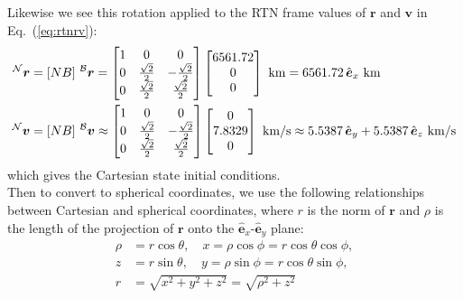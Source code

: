 \documentclass[titlepage]{article}
\begin{document}
Likewise we see this rotation applied to the RTN frame values of $\boldsymbol{r}$ and $\boldsymbol{v}$ in Eq.~(\ref{eq:rtnrv}):
\begin{equation}
	\begin{split}
		\prescript{\mathcal{N}}{}{\boldsymbol{r}}&=[NB]\,\prescript{\mathcal{B}}{}{\boldsymbol{r}}=
		\begin{bmatrix}
			1 & 0 & 0 \\
			0 & \frac{\sqrt{2}}{2} & -\frac{\sqrt{2}}{2} \\
			0 & \frac{\sqrt{2}}{2} & \frac{\sqrt{2}}{2}
		\end{bmatrix}
		\begin{bmatrix}
			6561.72 \\
			0 \\
			0
		\end{bmatrix}\text{ km}
		=6561.72\,\hat{\boldsymbol{e}}_x\text{ km} \\
		\prescript{\mathcal{N}}{}{\boldsymbol{v}}&=[NB]\,\prescript{\mathcal{B}}{}{\boldsymbol{v}}\approx
		\begin{bmatrix}
			1 & 0 & 0 \\
			0 & \frac{\sqrt{2}}{2} & -\frac{\sqrt{2}}{2} \\
			0 & \frac{\sqrt{2}}{2} & \frac{\sqrt{2}}{2}
		\end{bmatrix}
		\begin{bmatrix}
			0 \\
			7.8329 \\
			0
		\end{bmatrix}\text{ km/s}
		\approx5.5387\,\hat{\boldsymbol{e}}_y+5.5387\,\hat{\boldsymbol{e}}_z\text{ km/s}
	\end{split}
\end{equation}
which gives the Cartesian state initial conditions.\\

Then to convert to spherical coordinates, we use the following relationships between Cartesian and spherical coordinates, where $r$ is the norm of $\boldsymbol{r}$ and $\rho$ is the length of the projection of $\boldsymbol{r}$ onto the $\hat{\boldsymbol{e}}_x$-$\hat{\boldsymbol{e}}_y$ plane:
\begin{equation}
	\begin{split}
		\rho&=r\cos\theta,\quad x=\rho\cos\phi=r\cos\theta\cos\phi,\\
		z&=r\sin\theta,\quad y=\rho\sin\phi=r\cos\theta\sin\phi,\\
		r&=\sqrt{x^2+y^2+z^2}=\sqrt{\rho^2+z^2} \\
	\end{split}
	\label{eq:cartsphere}
\end{equation}
\end{document}
